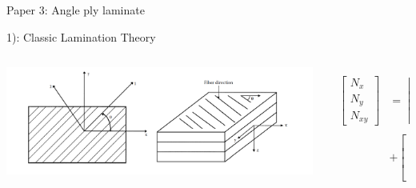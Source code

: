 \documentclass{beamer}
\begin{document}
\begin{frame}{Paper 3: Angle ply laminate}
	
\end{frame}


\begin{frame}{1): Classic Lamination Theory}
    \begin{columns}[c]
    \begin{column}{0.5\textwidth}
		\includegraphics[width=1.5\linewidth]{./fig/lamina_local_global_axes.png}
    \end{column}
	\begin{column}{0.5\textwidth}
		\begin{equation} \label{eq:force_and_moments}
			\begin{array}{l}
				\begin{aligned}
			\begin{bmatrix}
				N_x \\
				N_y \\
				N_{xy}
			\end{bmatrix}
			&=
			\begin{bmatrix}
				A_{11} & A_{12} & A_{16} \\
				A_{12} & A_{22} & A_{26} \\
				A_{16} & A_{26} & A_{66} 
			\end{bmatrix}
			\begin{bmatrix}
				\varepsilon_x^0 \\
				\varepsilon_y^0 \\
				\gamma_{xy}^0
			\end{bmatrix}   \\
			&+               
			\begin{bmatrix}
				B_{11} & B_{12} & B_{16} \\
				B_{11} & B_{12} & B_{16} \\
				B_{16} & B_{26} & B_{66} 
			\end{bmatrix}
			\begin{bmatrix}
				k_x \\

\end{bmatrix}
\end{aligned}
\end{array}
\end{equation}
\end{column}
\end{columns}
\end{frame}
\end{document}

